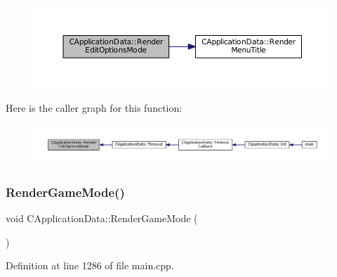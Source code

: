 \begin{figure}[H]
\begin{center}
\leavevmode
\includegraphics[width=350pt]{classCApplicationData_a7da1dd0b9a8d7c68d8df5f60b4e94189_cgraph}
\end{center}
\end{figure}
Here is the caller graph for this function\+:\nopagebreak
\begin{figure}[H]
\begin{center}
\leavevmode
\includegraphics[width=350pt]{classCApplicationData_a7da1dd0b9a8d7c68d8df5f60b4e94189_icgraph}
\end{center}
\end{figure}
\hypertarget{classCApplicationData_ae5ba05c6fb7e6f0414c26f0b44bc842c}{}\label{classCApplicationData_ae5ba05c6fb7e6f0414c26f0b44bc842c} 
\subsubsection{\texorpdfstring{Render\+Game\+Mode()}{RenderGameMode()}}
{\footnotesize\ttfamily void C\+Application\+Data\+::\+Render\+Game\+Mode (\begin{DoxyParamCaption}{ }\end{DoxyParamCaption})\hspace{0.3cm}{\ttfamily [protected]}}



Definition at line 1286 of file main.\+cpp.


